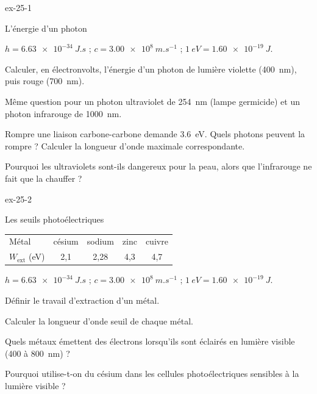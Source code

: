 \begin{blocLivre}{ex-25-1}
\begin{exercice}[1]{L'énergie d'un photon}
\begin{donnees}
$h=\qty{6,63e-34}{J.s}$ ; $c=\qty{3,00e8}{m.s^{-1}}$ ; $\qty{1}{eV}=\qty{1,60e-19}{J}$.
\end{donnees}
\begin{questions}
\item Calculer, en électronvolts, l'énergie d'un photon de lumière violette (\qty{400}{nm}), puis rouge (\qty{700}{nm}).
\item Même question pour un photon ultraviolet de \qty{254}{nm} (lampe germicide) et un photon infrarouge de \qty{1000}{nm}.
\item Rompre une liaison carbone-carbone demande \qty{3,6}{eV}. Quels photons peuvent la rompre ? Calculer la longueur
d'onde maximale correspondante.
\item Pourquoi les ultraviolets sont-ils dangereux pour la peau, alors que l'infrarouge ne fait que la chauffer ?
\end{questions}
\end{exercice}
\end{blocLivre}
\begin{blocLivre}{ex-25-2}
\begin{exercice}[1]{Les seuils photoélectriques}
\begin{center}
\begin{tabular}{lcccc}
\toprule
Métal & césium & sodium & zinc & cuivre \\
$W_\mathrm{ext}$ (eV) & 2,1 & 2,28 & 4,3 & 4,7 \\
\bottomrule
\end{tabular}
\end{center}
\begin{donnees}
$h=\qty{6,63e-34}{J.s}$ ; $c=\qty{3,00e8}{m.s^{-1}}$ ; $\qty{1}{eV}=\qty{1,60e-19}{J}$.
\end{donnees}
\begin{questions}
\item Définir le travail d'extraction d'un métal.
\item Calculer la longueur d'onde seuil de chaque métal.
\item Quels métaux émettent des électrons lorsqu'ils sont éclairés en lumière visible (400 à \qty{800}{nm}) ?
\item Pourquoi utilise-t-on du césium dans les cellules photoélectriques sensibles à la lumière visible ?
\end{questions}
\end{exercice}
\end{blocLivre}
